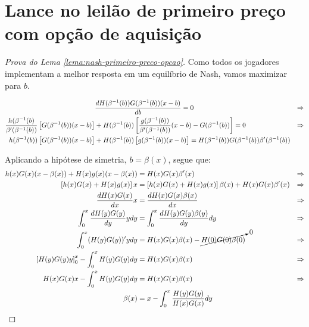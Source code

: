 \section{Lance no leilão de primeiro preço com opção de aquisição}
\begin{proof}[Prova do Lema \ref{lema:nash-primeiro-preco-opcao}]
	Como todos os jogadores implementam a melhor resposta em um equilíbrio de Nash, vamos maximizar para $b$.
	
	\begin{align*}
		& \frac{d H(\beta^{-1}(b)) G(\beta^{-1}(b)) (x - b)}{db} = 0 & \Rightarrow \\
		\frac { h(\beta^{-1}(b)}{\beta'(\beta^{-1}(b))} \left[ G(\beta^{-1}(b))(x - b) \right] & + H(\beta^{-1}(b)) \left[ \frac{g(\beta^{-1}(b))}{\beta'(\beta^{-1}(b))}(x - b) - G(\beta^{-1}(b)) \right] = 0 & \Rightarrow \\
		h(\beta^{-1}(b)) \left[ G(\beta^{-1}(b))(x - b) \right] & + H(\beta^{-1}(b)) \left[ g(\beta^{-1}(b))(x - b) \right] = H(\beta^{-1}(b))G(\beta^{-1}(b))\beta'(\beta^{-1}(b))
	\end{align*}

	Aplicando a hipótese de simetria, $b = \beta(x)$, segue que:
	\begin{align*}
		h(x)G(x)(x-\beta(x)) + H(x)g(x)(x-\beta(x)) & = H(x)G(x)\beta'(x) & \Rightarrow \\
		\left[ h(x)G(x) + H(x)g(x) \right]x & = \left[ h(x)G(x) + H(x)g(x) \right]\beta(x) + H(x)G(x)\beta'(x) & \Rightarrow \\
		\frac {d H(x)G(x) }{dx} x & = \frac{d H(x)G(x)\beta(x)}{dx} & \Rightarrow \\
		\int_0^x \frac {d H(y)G(y) }{dy} ydy & = \int_0^x \frac{d H(y)G(y)\beta(y)}{dy}dy & \Rightarrow \\
    	\int_0^x (H(y)G(y))'ydy & = H(x)G(x)\beta(x) - \cancelto{0}{H(0)G(0)\beta(0)} & \Rightarrow \\
    	\left[ H(y)G(y)y \right]_0^x - \int_0^x H(y)G(y)dy & = H(x)G(x)\beta(x) & \Rightarrow \\
    	H(x)G(x)x - \int_0^x H(y)G(y)dy & = H(x)G(x)\beta(x) & \Rightarrow \\
    	\beta(x) & = x - \int_0^x \frac{H(y)G(y)}{H(x)G(x)}dy
	\end{align*}
\end{proof}

